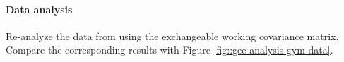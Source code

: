 %

 

\paragraph{Data analysis}

Re-analyze the data from \citet{royer2015incentives} using the exchangeable working covariance matrix. Compare the corresponding results with Figure \ref{fig::gee-analysis-gym-data}. 
 
